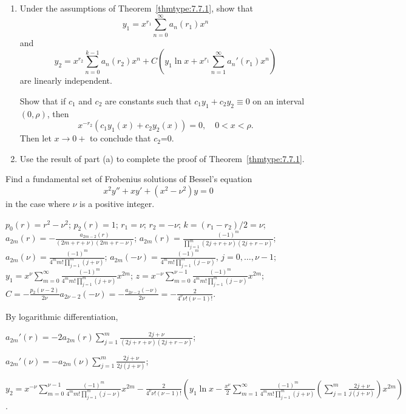 \documentclass{ximera}
\begin{document}
\begin{problem}\label{exer:7.7.41}
\begin{enumerate}
\item %
Under the assumptions of Theorem~\ref{thmtype:7.7.1}, show that
$$
y_1=x^{r_1}\sum_{n=0}^\infty  a_n(r_1)x^n
$$
and
$$
y_2=x^{r_2}\sum_{n=0}^{k-1}a_n(r_2)x^n+C\left(y_1\ln
x+x^{r_1}\sum_{n=1}^\infty a_n'(r_1)x^n\right)
$$
are linearly independent. 
\begin{hint}Show that if $c_1$ and $c_2$
are constants such that $c_1y_1+c_2y_2\equiv0$ on an interval
$(0,\rho)$, then
$$
x^{-r_2}(c_1y_1(x)+c_2y_2(x))=0,\quad 0<x<\rho.
$$
Then let $x\to0+$ to conclude that $c_2$=0.
\end{hint}
\item %
Use the result of part (a) to
complete the proof of Theorem~\ref{thmtype:7.7.1}.
\end{enumerate}
\end{problem}


\begin{problem}\label{exer:7.7.42}
Find a fundamental set of Frobenius solutions of Bessel's equation
$$
x^2y''+xy'+(x^2-\nu^2)y=0
$$
in the case where $\nu$  is a positive integer.

\begin{solution}
    $p_0(r)=r^2-\nu^2$; $p_2(r)=1$; $r_1=\nu$;
$r_2=-\nu$; $k=(r_1-r_2)/2=\nu$;
$a_{2m}(r)=-\frac{a_{2m-2}(r)}{(2m+r+\nu)(2m+r-\nu)}$;
$a_{2m}(r)=\frac{(-1)^m}{\prod_{j=1}^m(2j+r+\nu)(2j+r-\nu)}$;
$a_{2m}(\nu)=\frac{(-1)^m}{4^mm!\prod_{j=1}^m(j+\nu)}$;
$a_{2m}(-\nu)=\frac{(-1)^m}{4^mm!\prod_{j=1}^m(j-\nu)}$,
$j=0,\dots,\nu-1$; $y_1=x^\nu\sum_{m=0}^\infty\frac{(-1)^m}{4^mm!
\prod_{j=1}^m(j+\nu)}x^{2m}$; $
z=x^{-\nu}\sum_{m=0}^{\nu-1}\frac{(-1)^m}{4^mm!
\prod_{j=1}^m(j-\nu)}x^{2m}$; $C=-\frac{p_2(\nu-2)}{
2\nu}a_{2\nu-2}(-\nu)= -\frac{a_{2\nu-2}(-\nu)}{ 2\nu}=
-\frac{2}{4^\nu\nu!(\nu-1)!}$. 

By logarithmic differentiation,

$a_{2m}'(r)=-2
a_{2m}(r)\sum_{j=1}^m\frac{2j+\nu}{(2j+r+\nu)(2j+r-\nu)}$;

$a_{2m}'(\nu)=-a_{2m}(\nu)\sum_{j=1}^m\frac{2j+\nu}{2j(j+\nu)}$;

$y_2=x^{-\nu}\sum_{m=0}^{\nu-1}\frac{(-1)^m}{4^mm!\prod_{j=1}^m(j-\nu)}x^{2m}
-\frac{2}{4^\nu\nu!(\nu-1)!}\left(y_1 \ln x-\frac{x^\nu}{2}
\sum_{m=1}^\infty\frac{(-1)^m}{4^mm!\prod_{j=1}^m(j+\nu)}
\left(\sum_{j=1}^m\frac{2j+\nu}{ j(j+\nu)}\right) x^{2m}\right)$.

\end{solution}
\end{problem}
\end{document}
